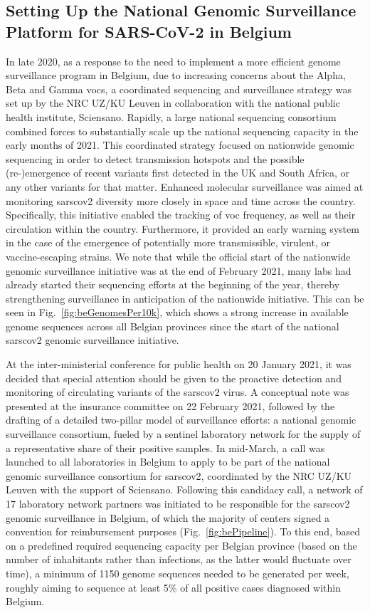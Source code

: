 \subsection{Setting Up the National Genomic Surveillance Platform for SARS-CoV-2 in Belgium}
In late 2020, as a response to the need to implement a more efficient genome surveillance program in Belgium, due to increasing concerns about the Alpha, Beta and Gamma \gls{voc}s, a coordinated sequencing and surveillance strategy was set up by the NRC UZ/KU Leuven in collaboration with the national public health institute, Sciensano.
Rapidly, a large national sequencing consortium combined forces to substantially scale up the national sequencing capacity in the early months of 2021.
This coordinated strategy focused on nationwide genomic sequencing in order to detect transmission hotspots and the possible (re-)emergence of recent variants first detected in the UK and South Africa, or any other variants for that matter.
Enhanced molecular surveillance was aimed at monitoring \gls{sarscov2} diversity more closely in space and time across the country.
Specifically, this initiative enabled the tracking of \gls{voc} frequency, as well as their circulation within the country.
Furthermore, it provided an early warning system in the case of the emergence of potentially more transmissible, virulent, or vaccine-escaping strains.
We note that while the official start of the nationwide genomic surveillance initiative was at the end of February 2021, many labs had already started their sequencing efforts at the beginning of the year, thereby strengthening surveillance in anticipation of the nationwide initiative.
This can be seen in Fig.~\ref{fig:beGenomesPer10k}, which shows a strong increase in available genome sequences across all Belgian provinces since the start of the national \gls{sarscov2} genomic surveillance initiative.

At the inter-ministerial conference for public health on 20 January 2021, it was decided that special attention should be given to the proactive detection and monitoring of circulating variants of the \gls{sarscov2} virus.
A conceptual note was presented at the insurance committee on 22 February 2021, followed by the drafting of a detailed two-pillar model of surveillance efforts: a national genomic surveillance consortium, fueled by a sentinel laboratory network for the supply of a representative share of their positive samples.
In mid-March, a call was launched to all laboratories in Belgium to apply to be part of the national genomic surveillance consortium for \gls{sarscov2}, coordinated by the NRC UZ/KU Leuven with the support of Sciensano.
Following this candidacy call, a network of 17 laboratory network partners was initiated to be responsible for the \gls{sarscov2} genomic surveillance in Belgium, of which the majority of centers signed a convention for reimbursement purposes (Fig.~\ref{fig:bePipeline}).
To this end, based on a predefined required sequencing capacity per Belgian province (based on the number of inhabitants rather than infections, as the latter would fluctuate over time), a minimum of 1150 genome sequences needed to be generated per week, roughly aiming to sequence at least 5\% of all positive cases diagnosed within Belgium.

